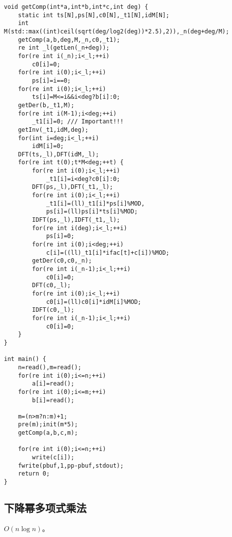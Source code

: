 \documentclass[12pt]{ctexart}
\begin{document}
\begin{lstlisting}
void getComp(int*a,int*b,int*c,int deg) {
    static int ts[N],ps[N],c0[N],_t1[N],idM[N];
    int M(std::max((int)ceil(sqrt(deg/log2(deg))*2.5),2)),_n(deg+deg/M);
    getComp(a,b,deg,M,_n,c0,_t1);
    re int _l(getLen(_n+deg));
    for(re int i(_n);i<_l;++i)
        c0[i]=0;
    for(re int i(0);i<_l;++i)
        ps[i]=i==0;
    for(re int i(0);i<_l;++i)
        ts[i]=M<=i&&i<deg?b[i]:0;
    getDer(b,_t1,M);
    for(re int i(M-1);i<deg;++i)
        _t1[i]=0; /// Important!!!
    getInv(_t1,idM,deg);
    for(int i=deg;i<_l;++i)
    	idM[i]=0;
    DFT(ts,_l),DFT(idM,_l);
    for(re int t(0);t*M<deg;++t) {
        for(re int i(0);i<_l;++i)
            _t1[i]=i<deg?c0[i]:0;
        DFT(ps,_l),DFT(_t1,_l);
        for(re int i(0);i<_l;++i)
            _t1[i]=(ll)_t1[i]*ps[i]%MOD,
            ps[i]=(ll)ps[i]*ts[i]%MOD;
        IDFT(ps,_l),IDFT(_t1,_l);
        for(re int i(deg);i<_l;++i)
            ps[i]=0;
        for(re int i(0);i<deg;++i)
            c[i]=((ll)_t1[i]*ifac[t]+c[i])%MOD;
        getDer(c0,c0,_n);
        for(re int i(_n-1);i<_l;++i)
            c0[i]=0;
        DFT(c0,_l);
        for(re int i(0);i<_l;++i)
            c0[i]=(ll)c0[i]*idM[i]%MOD;
        IDFT(c0,_l);
        for(re int i(_n-1);i<_l;++i)
            c0[i]=0;
    }
}

int main() {
    n=read(),m=read();
    for(re int i(0);i<=n;++i)
        a[i]=read();
    for(re int i(0);i<=m;++i)
        b[i]=read();
    
    m=(n>m?n:m)+1;
    pre(m);init(m*5);
    getComp(a,b,c,m);
    
    for(re int i(0);i<=n;++i)
        write(c[i]);
    fwrite(pbuf,1,pp-pbuf,stdout);
    return 0;
}
\end{lstlisting}

\subsection{下降幂多项式乘法}

$O(n\log n)$。
\end{document}
